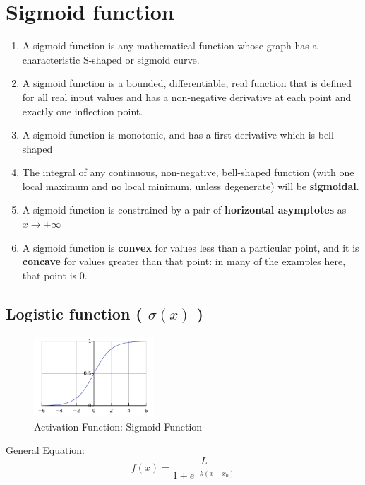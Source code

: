 \section{Sigmoid function \cite{wiki-activation-fn,wiki-Sigmoid_function}}

\begin{enumerate}
    \item A sigmoid function is any mathematical function whose graph has a characteristic S-shaped or sigmoid curve.
    \item A sigmoid function is a bounded, differentiable, real function that is defined for all real input values and has a non-negative derivative at each point and exactly one inflection point.
    \item A sigmoid function is monotonic, and has a first derivative which is bell shaped
    \item The integral of any continuous, non-negative, bell-shaped function (with one local maximum and no local minimum, unless degenerate) will be \textbf{sigmoidal}.
    \item A sigmoid function is constrained by a pair of \textbf{horizontal asymptotes} as $x\rightarrow \pm \infty$
    \item A sigmoid function is \textbf{convex} for values less than a particular point, and it is \textbf{concave} for values greater than that point: in many of the examples here, that point is 0.
\end{enumerate}

\subsection{Logistic function ( $\sigma(x)$ ) \cite{wiki-Logistic_function,wiki-Sigmoid_function}}\label{Logistic function}

\begin{figure}[H]
    \centering
    \includegraphics[height=3cm]{Pictures/activation-fns/sigmoid-fn.jpg}
    \caption{Activation Function: Sigmoid Function}
\end{figure}

General Equation:
\[
    f(x) = {\displaystyle\dfrac{L}{1 + e^{-k(x - x_{0})}}}
\]


